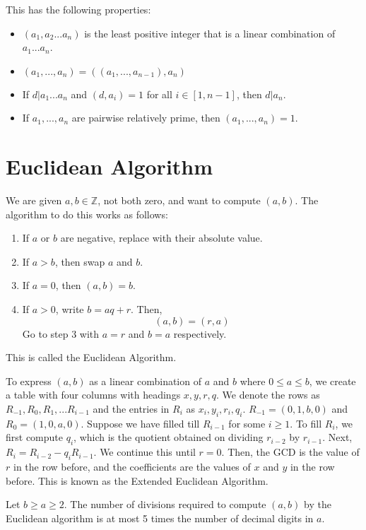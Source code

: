 \documentclass[12pt,letterpaper]{amsbook}
\theoremstyle{definition}
\newcommand{\Z}{\mathbb{Z}}
\begin{document}
This has the following properties:

\begin{itemize}
  \item $(a_1,a_2...a_n)$ is the least positive integer that is a linear combination of $a_1...a_n$.
  \item $(a_1,...,a_n) = ((a_1,...,a_{n-1}),a_n)$
  \item If $d | a_1...a_n$ and $(d,a_i) = 1$ for all $i \in [1,n-1]$, then $d|a_n$.
  \item If $a_1,...,a_n$ are pairwise relatively prime, then $(a_1,...,a_n) = 1$.
\end{itemize}

\section{Euclidean Algorithm}

We are given $a,b \in \Z$, not both zero, and want to compute $(a,b)$. The algorithm to do this works as follows:

\begin{enumerate}
  \item If $a$ or $b$ are negative, replace with their absolute value.
    \item If $a > b$, then swap $a$ and $b$.
    \item If $a = 0$, then $(a,b) = b$.
    \item If $a >0$, write $b = aq+r$. Then,
      \[(a,b) = (r,a)\]
      Go to step 3 with $a = r$ and $b=a$ respectively.
\end{enumerate}

This is called the Euclidean Algorithm.

To express $(a,b)$ as a linear combination of $a$ and $b$ where $0 \leq a \leq b$, we create a table with four columns with headings $x,y,r,q$. We denote the rows as $R_{-1}, R_0, R_1, ... R_{i-1}$ and the entries in $R_i$ as $x_i,y_i,r_i,q_i$. $R_{-1} = (0,1,b,0)$ and $R_0 = (1,0,a,0)$. Suppose we have filled till $R_{i-1}$ for some $i \geq 1$. To fill $R_i$, we first compute $q_i$, which is the quotient obtained on dividing $r_{i-2}$ by $r_{i-1}$. Next, $R_i = R_{i-2} - q_iR_{i-1}$. We continue this until $r=0$. Then, the GCD is the value of $r$ in the row before, and the coefficients are the values of $x$ and $y$ in the row before. This is known as the Extended Euclidean Algorithm.

\begin{theorem}
  Let $b \geq a \geq 2$. The number of divisions required to compute $(a,b)$ by the Euclidean algorithm is at most 5 times the number of decimal digits in $a$.
\end{theorem}
\end{document}
